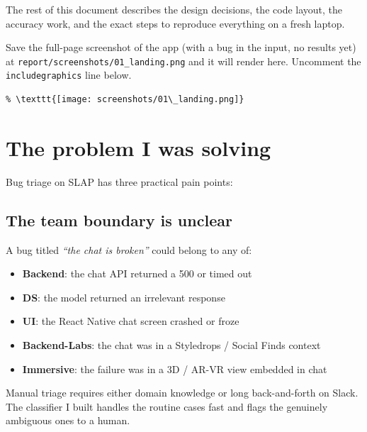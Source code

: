 \documentclass[11pt,a4paper]{article}
\begin{document}
The rest of this document describes the design decisions, the code layout,
the accuracy work, and the exact steps to reproduce everything on a fresh
laptop.

\vspace{1em}
\begin{screenshotbox}
Save the full-page screenshot of the app (with a bug in the input, no results
yet) at \texttt{report/screenshots/01\_landing.png} and it will render here.
Uncomment the \texttt{includegraphics} line below.

\begin{verbatim}
% \texttt{[image: screenshots/01\_landing.png]}
\end{verbatim}
\end{screenshotbox}

\newpage

\section{The problem I was solving}

Bug triage on SLAP has three practical pain points:

\subsection{The team boundary is unclear}

A bug titled \textit{``the chat is broken''} could belong to any of:

\begin{itemize}[leftmargin=1.2em,nosep]
\item \textbf{Backend}: the chat API returned a 500 or timed out
\item \textbf{DS}: the model returned an irrelevant response
\item \textbf{UI}: the React Native chat screen crashed or froze
\item \textbf{Backend-Labs}: the chat was in a Styledrops / Social Finds context
\item \textbf{Immersive}: the failure was in a 3D / AR-VR view embedded in chat
\end{itemize}

Manual triage requires either domain knowledge or long back-and-forth on
Slack. The classifier I built handles the routine cases fast and flags the
genuinely ambiguous ones to a human.
\end{document}
